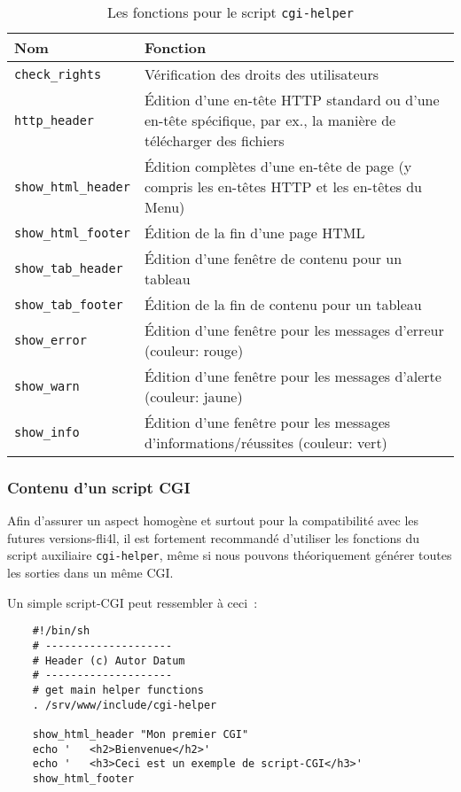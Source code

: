 \begin{table}[htbp]
  \centering
  \caption{Les fonctions pour le script \texttt{cgi-helper}}
  \label{tab:dev:cgi-helper}
  \begin{small}
    \begin{tabular}{|l|p{}|}
      \hline
      Nom                  & Fonction \\
      \hline
      \texttt{check\_rights}      & Vérification des droits des utilisateurs \\
      \texttt{http\_header}       & Édition d’une en-tête HTTP standard ou d’une
          en-tête spécifique, par ex., la manière de télécharger des fichiers \\
      \texttt{show\_html\_header} & Édition complètes d'une en-tête de page (y compris
          les en-têtes HTTP et les en-têtes du Menu) \\
      \texttt{show\_html\_footer} & Édition de la fin d'une page HTML \\
      \texttt{show\_tab\_header}  & Édition d’une fenêtre de contenu pour un tableau \\
      \texttt{show\_tab\_footer}  & Édition de la fin de contenu pour un tableau \\
      \texttt{show\_error}        & Édition d'une fenêtre pour les messages d'erreur (couleur: rouge) \\
      \texttt{show\_warn}         & Édition d'une fenêtre pour les messages d'alerte (couleur: jaune) \\
      \texttt{show\_info}         & Édition d'une fenêtre pour les messages d'informations/réussites (couleur: vert) \\
      \hline
    \end{tabular}
  \end{small}
\end{table}


\subsubsection{Contenu d'un script CGI}

Afin d'assurer un aspect homogène et surtout pour la compatibilité avec les
futures versions-fli4l, il est fortement recommandé d'utiliser les fonctions
du script auxiliaire \texttt{cgi-helper}, même si nous pouvons théoriquement générer
toutes les sorties dans un même CGI.

Un simple script-CGI peut ressembler à ceci~:

\begin{example}
\begin{verbatim}
    #!/bin/sh
    # --------------------
    # Header (c) Autor Datum
    # --------------------
    # get main helper functions
    . /srv/www/include/cgi-helper

    show_html_header "Mon premier CGI"
    echo '   <h2>Bienvenue</h2>'
    echo '   <h3>Ceci est un exemple de script-CGI</h3>'
    show_html_footer
\end{verbatim}
\end{example}



